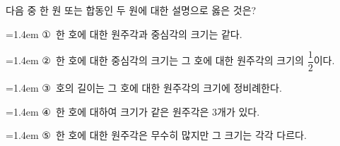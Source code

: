 다음 중 한 원 또는 합동인 두 원에 대한 설명으로 옳은 것은?
\par\medskip\par\noindent\hangindent=1.4em {\small ①}\ 한 호에 대한 원주각과 중심각의 크기는 같다.\par\noindent\hangindent=1.4em {\small ②}\ 한 호에 대한 중심각의 크기는 그 호에 대한 원주각의 크기의 $\dfrac{1}{2}$이다.\par\noindent\hangindent=1.4em {\small ③}\ 호의 길이는 그 호에 대한 원주각의 크기에 정비례한다.\par\noindent\hangindent=1.4em {\small ④}\ 한 호에 대하여 크기가 같은 원주각은 $3$개가 있다.\par\noindent\hangindent=1.4em {\small ⑤}\ 한 호에 대한 원주각은 무수히 많지만 그 크기는 각각 다르다.\par\medskip
